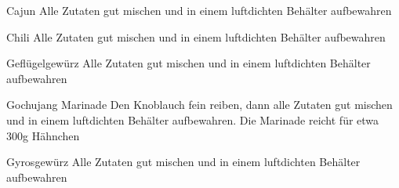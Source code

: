 

\begin{recipe}{Cajun}{}{}
Alle Zutaten gut mischen und in einem luftdichten Behälter aufbewahren
\end{recipe}


\begin{recipe}{Chili}{}{}
Alle Zutaten gut mischen und in einem luftdichten Behälter aufbewahren
\end{recipe}


\begin{recipe}{Geflügelgewürz}{}{}
Alle Zutaten gut mischen und in einem luftdichten Behälter aufbewahren
\end{recipe}


\begin{recipe}{Gochujang Marinade}{}{}
Den Knoblauch fein reiben, dann alle Zutaten gut mischen und in einem luftdichten Behälter aufbewahren. Die Marinade reicht für etwa 300g Hähnchen
\end{recipe} 


\begin{recipe}{Gyrosgewürz}{}{}
Alle Zutaten gut mischen und in einem luftdichten Behälter aufbewahren
\end{recipe}

